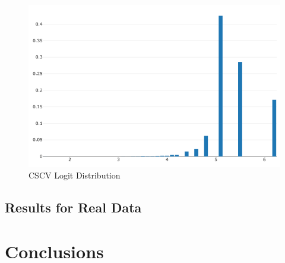 \documentclass[a4paper,latin]{paper}
\begin{document}
\begin{figure}[H]
	\centering \includegraphics[scale=0.5]{images/synthetic_results/logit_distribution.png}
	\caption{CSCV Logit Distribution}
	\label{figure-synthetic-logit-dist}
\end{figure}

\subsection{Results for Real Data}

\newpage
\section{Conclusions}\label{Conclusion}
\end{document}

